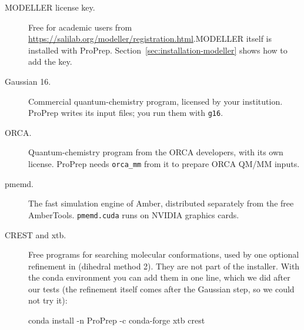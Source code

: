 \begin{description}
  \item[MODELLER license key.] Free for academic users from\newline
        \url{https://salilab.org/modeller/registration.html}.\newline MODELLER itself
        is installed with ProPrep. Section~\ref{sec:installation-modeller}
        shows how to add the key.
  \item[Gaussian 16.] Commercial quantum-chemistry program, licensed by your
        institution. ProPrep writes its input files; you run them with
        \texttt{g16}.
  \item[ORCA.] Quantum-chemistry program from the ORCA developers, with its
        own license. ProPrep needs \texttt{orca\_mm} from it to prepare ORCA
        QM/MM inputs.
  \item[pmemd.] The fast simulation engine of Amber, distributed separately
        from the free AmberTools. \texttt{pmemd.cuda} runs on NVIDIA graphics
        cards.
  \item[CREST and xtb.] Free programs for searching molecular conformations,
        used by one optional refinement in  (dihedral method 2). They
        are not part of the installer. With the conda environment you can add
        them in one line, which we did after our tests (the refinement itself
        comes after the Gaussian step, so we could not try it):
\begin{terminal}
conda install -n ProPrep -c conda-forge xtb crest
\end{terminal}
\end{description}

